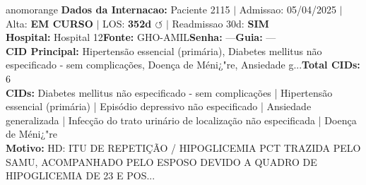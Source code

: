 \documentclass[a4paper,10pt]{article}
\begin{document}
\begin{anomalycard}[Internacao 3499 | GHO-AMIL | ALTO (z=4.12)]{anomorange}
\textbf{Dados da Internacao:} Paciente 2115 $\mid$ Admissao: 05/04/2025 $\mid$ Alta: \textcolor{anomorange}{\textbf{EM CURSO}} $\mid$ LOS: \textbf{352d \textcolor{anomorange}{$\circlearrowleft$}} $\mid$ Readmissao 30d: \textcolor{anomred}{\textbf{SIM}}\\
\textbf{Hospital:} Hospital 12\quad\textbf{Fonte:} GHO-AMIL\quad\textbf{Senha:} ---\quad\textbf{Guia:} ---\\
\textbf{CID Principal:} {\small Hipertensão essencial (primária), Diabetes mellitus não especificado - sem complicações, Doença de Méni¿"re, Ansiedade g...}\quad\textbf{Total CIDs:} 6\\

\textbf{CIDs:} {\scriptsize Diabetes mellitus não especificado - sem complicações | Hipertensão essencial (primária) | Episódio depressivo não especificado | Ansiedade generalizada | Infecção do trato urinário de localização não especificada | Doença de Méni¿"re}\\

\textbf{Motivo:} {\scriptsize HD: ITU DE REPETIÇÃO / HIPOGLICEMIA  PCT  TRAZIDA PELO SAMU, ACOMPANHADO PELO ESPOSO DEVIDO A QUADRO DE HIPOGLICEMIA DE 23 E POS...}\\


\end{anomalycard}
\end{document}
